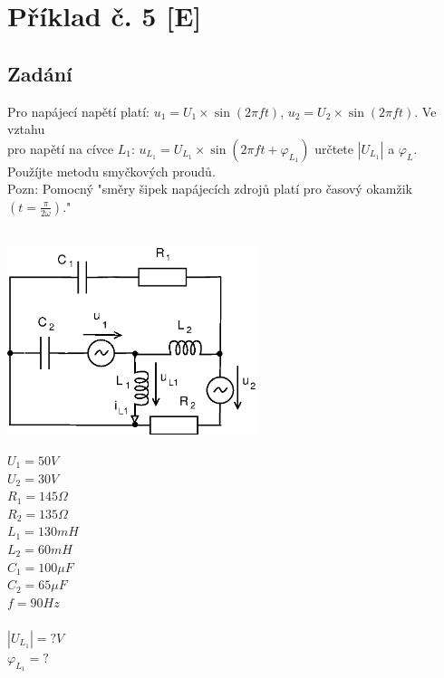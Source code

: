 \documentclass[12pt,a4paper,titlepage,final]{article}
\begin{document}
	\section*{Příklad č. 5 [E]} \label{pr5}


	\subsection*{Zadání}

	Pro napájecí napětí platí: $u_{1} = U_{1} \times \sin(2\pi ft)$, 
	$u_{2} = U_{2} \times \sin(2\pi ft)$. 
	Ve vztahu \\ pro napětí na cívce $L_{1}$: 
	$u_{L_{1}} = U_{L_{1}} \times \sin(2\pi ft + \varphi_{L_{1}})$ určtete
	$|U_{L_{1}}|$ a $\varphi_{L}$. \\ Použíjte metodu smyčkových proudů. \\
	
	\noindent Pozn: Pomocný "směry šipek napájecích zdrojů platí pro časový 
	okamžik $(t = \frac{\pi}{2\omega} )$." \\
	\\
	
	\begin{minipage}[c]{0.6\textwidth}
		\includegraphics[height=5.5cm]{img/Pr5_2012.eps}
		\label{fig:pr5_obvod}
	\end{minipage}
	\begin{minipage}[c]{0.25\textwidth}
		$U_{1} = 50 V$ \\
		$U_{2} = 30 V$ \\
		$R_{1} = 145 \Omega$ \\
		$R_{2} = 135 \Omega$ \\
		$L_{1} = 130 mH$ \\
		$L_{2} = 60 mH$ \\
		$C_{1} = 100 \mu F$ \\
		$C_{2} = 65 \mu F$ \\
		$f = 90 Hz$ \\
		\\
		$|U_{L_{1}}| = ? V$ \\
		$\varphi_{L_{1}} = ?$
	\end{minipage}
	\\
\end{document}
